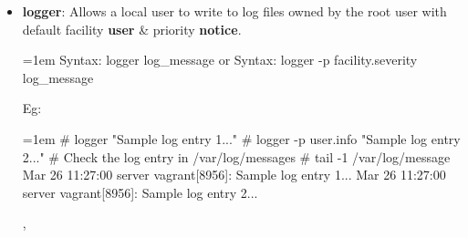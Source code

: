 \setlength{\columnsep}{3pt}
\begin{flushleft}
\bigskip


\begin{itemize}
\item \textbf{logger}: Allows a local user to write to log files owned by the root user with default facility \textbf{user} \& priority \textbf{notice}.
\begin{tcolorbox}[breakable,notitle,boxrule=-0pt,colback=pink,colframe=pink]
	\color{black}
	\font=1em
	Syntax: logger log\_message
	\newline
	or
	\newline
	Syntax: logger -p facility.severity	 log\_message
	\font=4pt
\end{tcolorbox}
Eg:	
\begin{tcolorbox}[breakable,notitle,boxrule=-0pt,colback=black,colframe=black]
	\color{green}
	\font=1em
	\# logger "Sample log entry 1..."
	\newline
	\# logger -p user.info "Sample log entry 2..."
	\newline
	\newline
	\color{yellow}
	\# Check the log entry in /var/log/messages
	\newline
	\color{green}
	\# tail -1 /var/log/message
	\newline
	\color{white}
	Mar 26 11:27:00 server vagrant[8956]: Sample log entry 1...
	\newline
	Mar 26 11:27:00 server vagrant[8956]: Sample log entry 2...
	\font=4pt
\end{tcolorbox}
	, 
	
\end{itemize}



\end{flushleft}
\newpage


